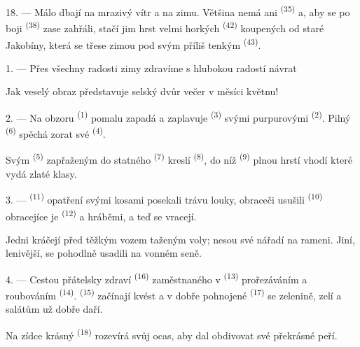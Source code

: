 18. --- Málo dbají na mrazivý vítr a na zimu. Většina nemá ani 
\textsuperscript{(35)} a, aby se po boji  \textsuperscript{(38)}
zase zahřáli, stačí jim hrst velmi horkých  \textsuperscript{(42)} koupených
od staré  Jakobíny, která se třese zimou pod svým příliš tenkým
 \textsuperscript{(43)}.

\VUsaut{3.0mm}
\VUsaut{3.0mm}

\VUsaut{4.0mm}

1. --- Přes všechny radosti zimy zdravíme s hlubokou radostí návrat 

Jak veselý obraz představuje selský dvůr večer v měsíci květnu!

2. --- Na obzoru  \textsuperscript{(1)} pomalu zapadá a zaplavuje
 \textsuperscript{(3)} svými purpurovými 
\textsuperscript{(2)}. Pilný  \textsuperscript{(6)} spěchá zorat své
 \textsuperscript{(4)}.

Svým  \textsuperscript{(5)} zapřaženým do statného 
\textsuperscript{(7)} kreslí  \textsuperscript{(8)}, do níž
 \textsuperscript{(9)} plnou hrstí vhodí  které vydá
zlaté klasy.

3. ---  \textsuperscript{(11)} opatření svými kosami posekali trávu louky,
obraceči usušili  \textsuperscript{(10)} obracejíce je
 \textsuperscript{(12)} a hráběmi, a teď se vracejí.

Jedni kráčejí před těžkým vozem taženým voly; nesou své nářadí na rameni. Jiní, lenivější, se
pohodlně usadili na vonném seně.

4. --- Cestou přátelsky zdraví  \textsuperscript{(16)} zaměstnaného v
 \textsuperscript{(13)} prořezáváním
 a roubováním  \textsuperscript{(14)}.
 \textsuperscript{(15)} začínají kvést a v dobře pohnojené
 \textsuperscript{(17)} se zelenině, zelí a salátům už
dobře daří.

Na zídce krásný  \textsuperscript{(18)} rozevírá svůj ocas, aby dal obdivovat své
překrásné peří.

